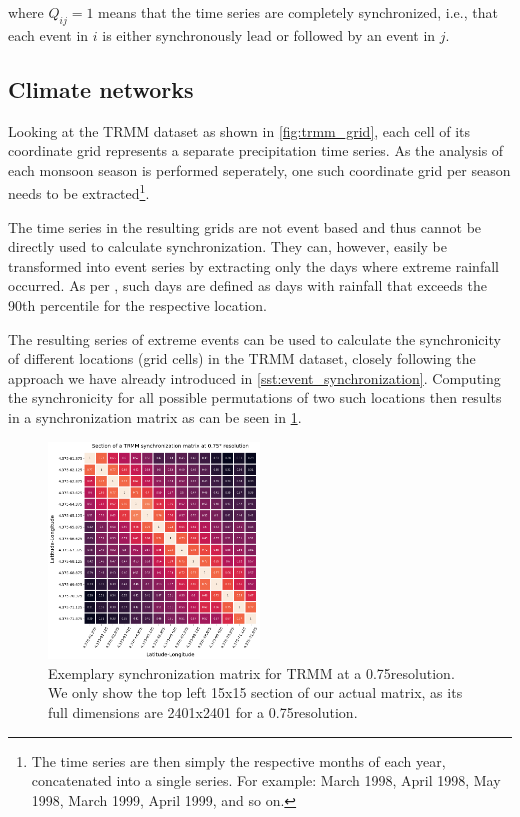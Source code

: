 where $Q_{ij} = 1$ means that the time series are completely synchronized, i.e., that each event in $i$ is either synchronously lead or followed by an event in $j$.

\subsection{Climate networks}
\label{sst:climate_networks}
Looking at the TRMM dataset as shown in \cref{fig:trmm_grid}, each cell of its coordinate grid represents a separate precipitation time series. As the analysis of each monsoon season is performed seperately, one such coordinate grid per season needs to be extracted\footnote{The time series are then simply the respective months of each year, concatenated into a single series. For example: March 1998, April 1998, May 1998, March 1999, April 1999, and so on.}.

The time series in the resulting grids are not event based and thus cannot be directly used to calculate synchronization. They can, however, easily be transformed into event series by extracting only the days where extreme rainfall occurred. As per \citet{Stolbova.2015}, such days are defined as days with rainfall that exceeds the 90th percentile for the respective location.

The resulting series of extreme events can be used to calculate the synchronicity of different locations (grid cells) in the TRMM dataset, closely following the approach we have already introduced in \cref{sst:event_synchronization}. Computing the synchronicity for all possible permutations of two such locations then results in a synchronization matrix as can be seen in \cref{fig:synchronization_matrix}.

\begin{figure}[h]
  \centering
  \includegraphics[width=0.5\textwidth]{./99_appendix/img/trmm_sync_example}
  \caption{Exemplary synchronization matrix for TRMM at a 0.75\degree resolution. We only show the top left 15x15 section of our actual matrix, as its full dimensions are 2401x2401 for a 0.75\degree resolution.}
  \label{fig:synchronization_matrix}
\end{figure}

